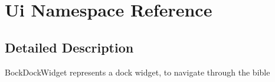 \hypertarget{namespaceUi}{
\section{Ui Namespace Reference}
\label{namespaceUi}
}


\subsection{Detailed Description}
BockDockWidget represents a dock widget, to navigate through the bible 